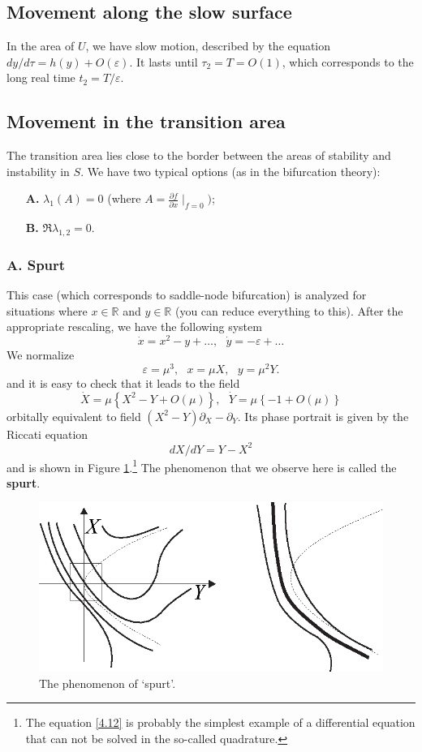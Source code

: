\subsection{Movement along the slow surface}
In the area of $U$, we have slow motion, described by the equation $dy/d\tau =h(y)+O(\varepsilon )$. It lasts until $\tau_{2}=T=O(1)$, which corresponds to the long real time $t_{2}=T/\varepsilon .$

\subsection{Movement in the transition area}
The transition area lies close to the border between the areas of stability and instability in $S$. We have two typical options (as in the bifurcation theory):
\begin{enumerate}
	\item[\textbf{A.}] $\lambda_1(A) = 0$ (where $A = \frac{\partial f}{\partial x} \mid_{f = 0})$;
	\item[\textbf{B.}] $\Re \lambda_{1,2} =0$.
\end{enumerate}

\subsubsection{A. Spurt}
This case (which corresponds to saddle-node bifurcation) is analyzed for situations where $x \in \mathbb{R}$ and $y \in \mathbb{R}$ (you can reduce everything to this). After the appropriate rescaling, we have the following system
$$
\dot{x}=x^{2}-y+\ldots ,\text{ \ \ }\dot{y}=-\varepsilon +\ldots
$$
We normalize
$$
\varepsilon =\mu ^{3},\text{ \ \ }x=\mu X,\text{ \ \ }y=\mu^{2}Y.
$$
and it is easy to check that it leads to the field
$$
\dot{X}=\mu \left\{ X^{2}-Y+O(\mu )\right\} ,\text{ \ \ }\dot{Y}=\mu \left\{-1+O(\mu )\right\}
$$
orbitally equivalent to field $\left( X^{2}-Y\right) \partial_{X}-\partial _{Y}$. Its phase portrait is given by the Riccati equation
\begin{equation}
\label{4.12}
dX/dY=Y-X^{2}
\end{equation}
and is shown in Figure \ref{fig:4.7}.\footnote{The equation \eqref{4.12} is probably the simplest example of a differential equation that can not be solved in the so-called quadrature.} The phenomenon that we observe here is called the \textbf{spurt}.

\begin{figure}[!ht]
	\centering
	\includegraphics [scale=1.4]{jtr47}
	\caption{The phenomenon of `spurt'.}
	\label{fig:4.7}
\end{figure}

